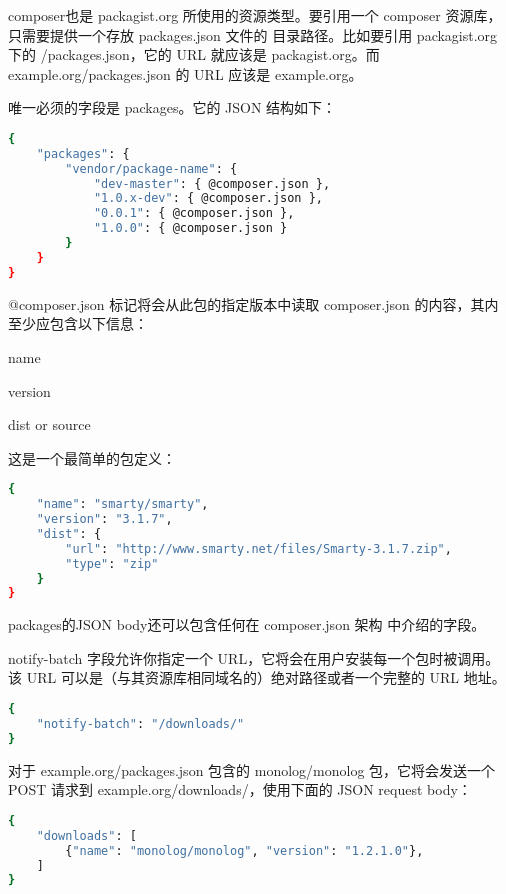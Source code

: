 composer也是 packagist.org 所使用的资源类型。要引用一个 composer 资源库，只需要提供一个存放 packages.json 文件的 目录路径。比如要引用 packagist.org 下的 /packages.json，它的 URL 就应该是 packagist.org。而 example.org/packages.json 的 URL 应该是 example.org。

唯一必须的字段是 packages。它的 JSON 结构如下：


\begin{lstlisting}[language=bash]
{
    "packages": {
        "vendor/package-name": {
            "dev-master": { @composer.json },
            "1.0.x-dev": { @composer.json },
            "0.0.1": { @composer.json },
            "1.0.0": { @composer.json }
        }
    }
}
\end{lstlisting}

@composer.json 标记将会从此包的指定版本中读取 composer.json 的内容，其内至少应包含以下信息：

\begin{compactitem}
\item name
\item version
\item dist or source
\end{compactitem}

这是一个最简单的包定义：

\begin{lstlisting}[language=bash]
{
    "name": "smarty/smarty",
    "version": "3.1.7",
    "dist": {
        "url": "http://www.smarty.net/files/Smarty-3.1.7.zip",
        "type": "zip"
    }
}
\end{lstlisting}

packages的JSON body还可以包含任何在 composer.json 架构 中介绍的字段。

notify-batch 字段允许你指定一个 URL，它将会在用户安装每一个包时被调用。该 URL 可以是（与其资源库相同域名的）绝对路径或者一个完整的 URL 地址。

\begin{lstlisting}[language=bash]
{
    "notify-batch": "/downloads/"
}
\end{lstlisting}

对于 example.org/packages.json 包含的 monolog/monolog 包，它将会发送一个 POST 请求到 example.org/downloads/，使用下面的 JSON request body：



\begin{lstlisting}[language=bash]
{
    "downloads": [
        {"name": "monolog/monolog", "version": "1.2.1.0"},
    ]
}
\end{lstlisting}

